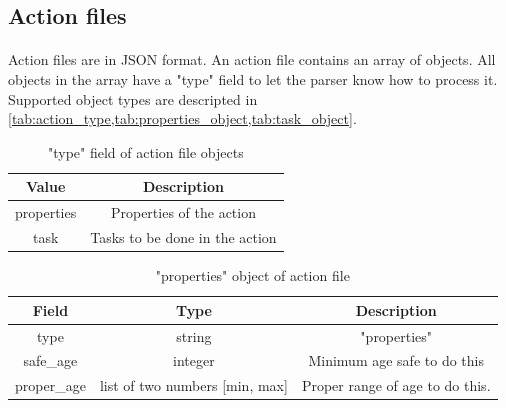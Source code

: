 \documentclass[mscthesis]{usiinfthesis}
\begin{document}
\subsection{Action files}
\paragraph{}
Action files are in JSON format. An action file contains an array of objects. All objects in the array have a "type" field to let the parser know how to process it. Supported object types are descripted in \cref{tab:action_type,tab:properties_object,tab:task_object}.

\begin{table}[H]
  \centering
  \begin{tabular}{|c|c|}
    \hline
    Value      & Description                    \\
    \hline
    properties & Properties of the action       \\
    task       & Tasks to be done in the action \\
    \hline
  \end{tabular}
  \caption{"type" field of action file objects}
  \label{tab:action_type}
\end{table}


\begin{table}[H]
  \centering
  \begin{tabular}{|c|c|c|}
    \hline
    Field       & Type                           & Description                     \\
    \hline
    type        & string                         & "properties"                    \\
    safe\_age   & integer                        & Minimum age safe to do this     \\
    proper\_age & list of two numbers [min, max] & Proper range of age to do this. \\
    \hline
  \end{tabular}
  \caption{"properties" object of action file}
  \label{tab:properties_object}
\end{table}
\end{document}
